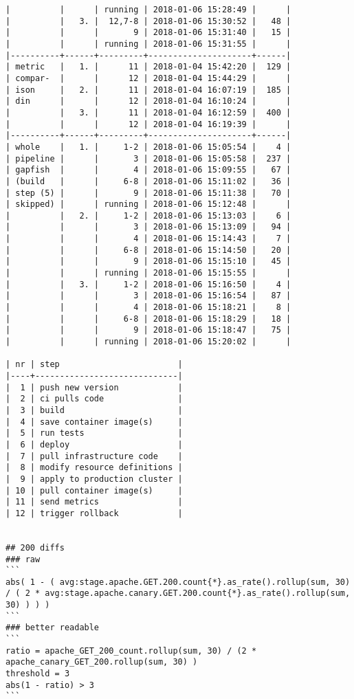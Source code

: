 \begin{verbatim}
|          |      | running | 2018-01-06 15:28:49 |      |
|          |   3. |  12,7-8 | 2018-01-06 15:30:52 |   48 |
|          |      |       9 | 2018-01-06 15:31:40 |   15 |
|          |      | running | 2018-01-06 15:31:55 |      |
|----------+------+---------+---------------------+------|
| metric   |   1. |      11 | 2018-01-04 15:42:20 |  129 |
| compar-  |      |      12 | 2018-01-04 15:44:29 |      |
| ison     |   2. |      11 | 2018-01-04 16:07:19 |  185 |
| din      |      |      12 | 2018-01-04 16:10:24 |      |
|          |   3. |      11 | 2018-01-04 16:12:59 |  400 |
|          |      |      12 | 2018-01-04 16:19:39 |      |
|----------+------+---------+---------------------+------|
| whole    |   1. |     1-2 | 2018-01-06 15:05:54 |    4 |
| pipeline |      |       3 | 2018-01-06 15:05:58 |  237 |
| gapfish  |      |       4 | 2018-01-06 15:09:55 |   67 |
| (build   |      |     6-8 | 2018-01-06 15:11:02 |   36 |
| step (5) |      |       9 | 2018-01-06 15:11:38 |   70 |
| skipped) |      | running | 2018-01-06 15:12:48 |      |
|          |   2. |     1-2 | 2018-01-06 15:13:03 |    6 |
|          |      |       3 | 2018-01-06 15:13:09 |   94 |
|          |      |       4 | 2018-01-06 15:14:43 |    7 |
|          |      |     6-8 | 2018-01-06 15:14:50 |   20 |
|          |      |       9 | 2018-01-06 15:15:10 |   45 |
|          |      | running | 2018-01-06 15:15:55 |      |
|          |   3. |     1-2 | 2018-01-06 15:16:50 |    4 |
|          |      |       3 | 2018-01-06 15:16:54 |   87 |
|          |      |       4 | 2018-01-06 15:18:21 |    8 |
|          |      |     6-8 | 2018-01-06 15:18:29 |   18 |
|          |      |       9 | 2018-01-06 15:18:47 |   75 |
|          |      | running | 2018-01-06 15:20:02 |      |

| nr | step                        |
|----+-----------------------------|
|  1 | push new version            |
|  2 | ci pulls code               |
|  3 | build                       |
|  4 | save container image(s)     |
|  5 | run tests                   |
|  6 | deploy                      |
|  7 | pull infrastructure code    |
|  8 | modify resource definitions |
|  9 | apply to production cluster |
| 10 | pull container image(s)     |
| 11 | send metrics                |
| 12 | trigger rollback            |


## 200 diffs
### raw
```
abs( 1 - ( avg:stage.apache.GET.200.count{*}.as_rate().rollup(sum, 30) / ( 2 * avg:stage.apache.canary.GET.200.count{*}.as_rate().rollup(sum, 30) ) ) )
```
### better readable
```
ratio = apache_GET_200_count.rollup(sum, 30) / (2 * apache_canary_GET_200.rollup(sum, 30) )
threshold = 3
abs(1 - ratio) > 3
```
\end{verbatim}
